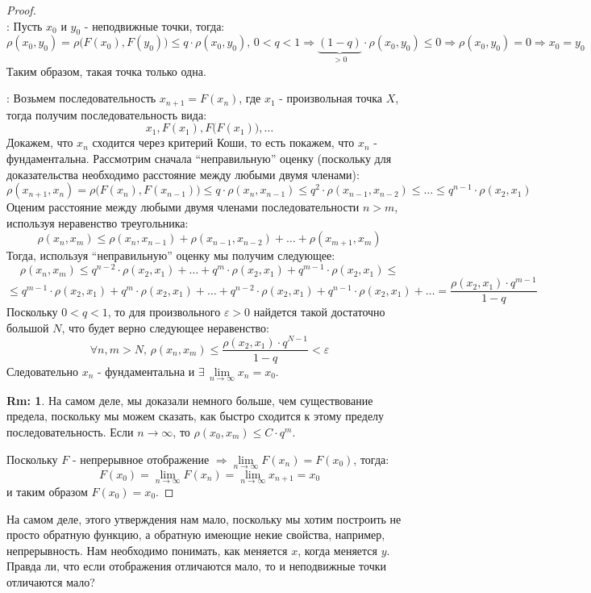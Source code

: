 \documentclass[12pt]{article}
\newcommand{\VE}{\varepsilon}
\theoremstyle{definition}
\newtheorem{rem}{Rm:}
\begin{document}
\begin{proof}\hfill\\
	: Пусть $x_0$ и $y_0$ - неподвижные точки, тогда:
	$$
		\rho(x_0,y_0) = \rho\big(F(x_0),F(y_0)\big) \leq q{\cdot}\rho(x_0,y_0), \, 0 < q < 1 \Rightarrow \underbrace{(1-q)}_{> 0}{\cdot}\rho(x_0,y_0) \leq 0 \Rightarrow \rho(x_0,y_0) = 0 \Rightarrow x_0 = y_0
	$$
	Таким образом, такая точка только одна.
	
	: Возьмем последовательность $x_{n+1} = F(x_n)$, где $x_1$ - произвольная точка $X$, тогда получим последовательность вида:
	$$
		x_1, F(x_1), F\big(F(x_1)\big), \dotsc 
	$$
	Докажем, что $x_n$ сходится через критерий Коши, то есть покажем, что $x_n$ - фундаментальна. Рассмотрим сначала ``неправильную'' оценку (поскольку для доказательства необходимо расстояние между любыми двумя членами):
	$$
		\rho(x_{n+1},x_n) = \rho\big(F(x_n), F(x_{n-1})\big) \leq q{\cdot}\rho(x_n, x_{n-1}) \leq q^2 {\cdot}\rho(x_{n-1}, x_{n-2}) \leq \dotsc \leq q^{n-1} {\cdot}\rho(x_2,x_1)
	$$
	Оценим расстояние между любыми двумя членами последовательности $n > m$, используя неравенство треугольника:
	$$
		\rho(x_n,x_m) \leq \rho(x_n, x_{n-1}) + \rho(x_{n-1},x_{n-2}) + \dotsc + \rho(x_{m+1},x_m)
	$$
	Тогда, используя ``неправильную'' оценку мы получим следующее:
	$$
		\rho(x_n,x_m) \leq q^{n-2}{\cdot}\rho(x_2,x_1) + \dotsc + q^m{\cdot}\rho(x_2,x_1) +  q^{m-1}{\cdot}\rho(x_2,x_1)  \leq  
	$$
	$$
		\leq q^{m-1}{\cdot}\rho(x_2,x_1) + q^m{\cdot}\rho(x_2,x_1) + \dotsc + q^{n-2}{\cdot}\rho(x_2,x_1) + q^{n-1}{\cdot}\rho(x_2,x_1) + \dotsc = \dfrac{\rho(x_2,x_1){\cdot}q^{m-1}}{1- q}
	$$
	Поскольку $0 < q < 1$, то для произвольного $\VE > 0$ найдется такой достаточно большой $N$, что будет верно следующее неравенство:
	$$	
		\forall n, m > N, \, \rho(x_n, x_m) \leq \dfrac{\rho(x_2,x_1){\cdot}q^{N-1}}{1- q} < \VE
	$$
	Следовательно $x_n$ - фундаментальна и $\exists \, \lim\limits_{n\to \infty}x_n = x_0$.
	\begin{rem}
		На самом деле, мы доказали немного больше, чем существование предела, поскольку мы можем сказать, как быстро сходится к этому пределу последовательность. Если $n \to \infty$, то $\rho(x_0, x_m) \leq C{\cdot}q^m$.
	\end{rem}
	Поскольку $F$ - непрерывное отображение $\Rightarrow \lim\limits_{n \to \infty}F(x_n) = F(x_0)$, тогда:
	$$
		F(x_0) = \lim\limits_{n\to \infty} F(x_n) = \lim\limits_{n\to \infty} x_{n+1} = x_0
	$$
	и таким образом $F(x_0) = x_0$.
\end{proof}
На самом деле, этого утверждения нам мало, поскольку мы хотим построить не просто обратную функцию, а обратную имеющие некие свойства, например, непрерывность. Нам необходимо понимать, как меняется $x$, когда меняется $y$. Правда ли, что если отображения отличаются мало, то и неподвижные точки отличаются мало?
\end{document}
